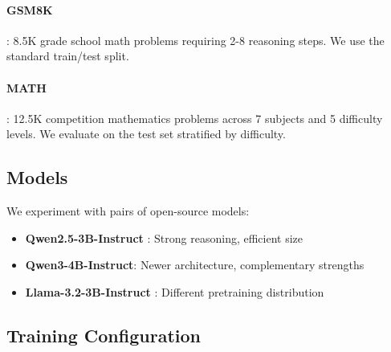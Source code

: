 \documentclass[11pt]{article}
\begin{document}
\paragraph{GSM8K} \citep{cobbe2021gsm8k}: 8.5K grade school math problems requiring 2-8 reasoning steps. We use the standard train/test split.

\paragraph{MATH} \citep{hendrycks2021math}: 12.5K competition mathematics problems across 7 subjects and 5 difficulty levels. We evaluate on the test set stratified by difficulty.

\subsection{Models}

We experiment with pairs of open-source models:
\begin{itemize}
    \item \textbf{Qwen2.5-3B-Instruct} \citep{qwen2024}: Strong reasoning, efficient size
    \item \textbf{Qwen3-4B-Instruct}: Newer architecture, complementary strengths
    \item \textbf{Llama-3.2-3B-Instruct} \citep{touvron2023llama}: Different pretraining distribution
\end{itemize}

\subsection{Training Configuration}
\end{document}
